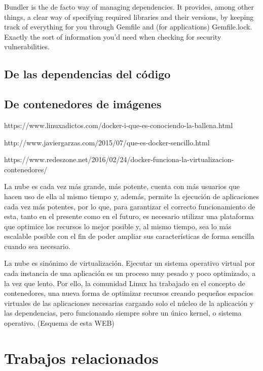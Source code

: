 
Bundler is the de facto way of managing dependencies. It provides, among other things, a clear way of specifying required libraries and their versions, by keeping track of everything for you through Gemfile and (for applications) Gemfile.lock. Exactly the sort of information you’d need when checking for security vulnerabilities.

\subsection{De las dependencias del código}


\subsection{De contenedores de imágenes}


https://www.linuxadictos.com/docker-i-que-es-conociendo-la-ballena.html

http://www.javiergarzas.com/2015/07/que-es-docker-sencillo.html

https://www.redeszone.net/2016/02/24/docker-funciona-la-virtualizacion-contenedores/


La nube es cada vez más grande, más potente, cuenta con más usuarios que hacen uso de ella al mismo tiempo y, además, permite la ejecución de aplicaciones cada vez más potentes, por lo que, para garantizar el correcto funcionamiento de esta, tanto en el presente como en el futuro, es necesario utilizar una plataforma que optimice los recursos lo mejor posible y, al mismo tiempo, sea lo más escalable posible con el fin de poder ampliar sus características de forma sencilla cuando sea necesario.

La nube es sinónimo de virtualización. Ejecutar un sistema operativo virtual por cada instancia de una aplicación es un proceso muy pesado y poco optimizado, a la vez que lento. Por ello, la comunidad Linux ha trabajado en el concepto de contenedores, una nueva forma de optimizar recursos creando pequeños espacios virtuales de las aplicaciones necesarias cargando solo el núcleo de la aplicación y las dependencias, pero funcionando siempre sobre un único kernel, o sistema operativo. (Esquema de esta WEB)

\section{Trabajos relacionados}

\endinput